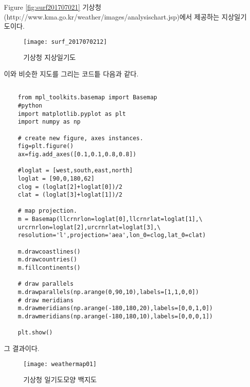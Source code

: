 Figure \ref{fig:surf201707021} \은 기상청(http://www.kma.go.kr/weather/images/analysischart.jsp)에서 제공하는 지상일기도이다. 

\begin{figure}[h]
	\centering
	\texttt{[image: surf\_2017070212]}
	\caption{기상청 지상일기도}
	\label{fig:surf2017070212}
\end{figure}

이와 비슷한 지도를 그리는 코드틑 다음과 같다.

\begin{code}
	\begin{lstlisting}
	
	from mpl_toolkits.basemap import Basemap
	#python 
	import matplotlib.pyplot as plt
	import numpy as np
	
	# create new figure, axes instances.
	fig=plt.figure()
	ax=fig.add_axes([0.1,0.1,0.8,0.8])
	
	#loglat = [west,south,east,north]
	loglat = [90,0,180,62]
	clog = (loglat[2]+loglat[0])/2
	clat = (loglat[3]+loglat[1])/2
	
	# map projection.
	m = Basemap(llcrnrlon=loglat[0],llcrnrlat=loglat[1],\
	urcrnrlon=loglat[2],urcrnrlat=loglat[3],\
	resolution='l',projection='aea',lon_0=clog,lat_0=clat)
	
	m.drawcoastlines()
	m.drawcountries()
	m.fillcontinents()
	
	# draw parallels
	m.drawparallels(np.arange(0,90,10),labels=[1,1,0,0])
	# draw meridians
	m.drawmeridians(np.arange(-180,180,20),labels=[0,0,1,0])
	m.drawmeridians(np.arange(-180,180,10),labels=[0,0,0,1])
	
	plt.show()	
	\end{lstlisting}
\end{code}

그 결과이다. 

\begin{figure}[h]
	\centering
	\texttt{[image: weathermap01]}
	\caption{기상청 일기도모양 백지도}
	\label{fig:weathermap01}
\end{figure}